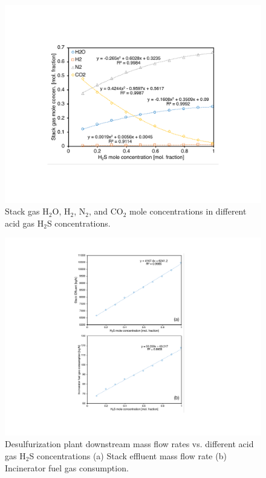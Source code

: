 \documentclass[11pt]{report}
\begin{document}
\begin{figure}
\includegraphics[width=1\columnwidth]{images/Claus_concent2.pdf}
\caption{Stack gas H$_2$O, H$_2$, N$_2$, and CO$_2$ mole concentrations in different acid gas H$_2$S concentrations.}
\label{fig:Claus_concent2}
\end{figure}

\begin{figure}
\includegraphics[width=1\columnwidth]{images/Claus_flowrates.pdf}
\caption{Desulfurization plant downstream mass flow rates vs. different acid gas H$_2$S concentrations (a) Stack effluent mass flow rate (b) Incinerator fuel gas consumption.}
\label{fig:Claus_flowrates}
\end{figure}
\end{document}

